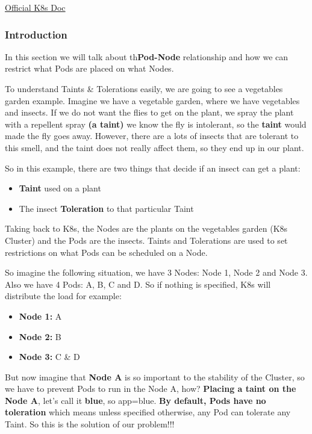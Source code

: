 \documentclass{article}
\begin{document}
\href{https://kubernetes.io/docs/concepts/scheduling-eviction/taint-and-toleration/}{Official K8s Doc}

\subsubsection{Introduction}

In this section we will talk about th\textbf{Pod-Node} relationship and how we can restrict what Pods are placed on what Nodes. 

To understand Taints \& Tolerations easily, we are going to see a vegetables garden example. Imagine we have a vegetable garden, where we have vegetables and insects. If we do not want the flies to get on the plant, we spray the plant with a repellent spray \textbf{(a taint)} we know the fly is intolerant, so the \textbf{taint} would made the fly goes away. However, there are a lots of insects that are tolerant to this smell, and the taint does not really affect them, so they end up in our plant.

So in this example, there are two things that decide if an insect can get a plant:

\begin{itemize}
    \item \textbf{Taint} used on a plant
    \item The insect \textbf{Toleration} to that particular Taint
\end{itemize}

Taking back to K8s, the Nodes are the plants on the vegetables garden (K8s Cluster) and the Pods are the insects. Taints and Tolerations are used to set restrictions on what Pods can be scheduled on a Node.

So imagine the following situation, we have 3 Nodes: Node 1, Node 2 and Node 3. Also we have 4 Pods: A, B, C and D. So if nothing is specified, K8s will distribute the load for example:

\begin{itemize}
    \item \textbf{Node 1:} A
    \item \textbf{Node 2:} B
    \item \textbf{Node 3:} C \& D
\end{itemize}

But now imagine that \textbf{Node A} is so important to the stability of the Cluster, so we have to prevent Pods to run in the Node A, how? \textbf{Placing a taint on the Node A}, let's call it \textbf{blue}, so app=blue. \textbf{By default, Pods have no toleration} which means unless specified otherwise, any Pod can tolerate any Taint. So this is the solution of our problem!!!
\end{document}
